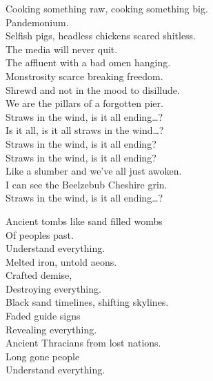 Cooking something raw, cooking something big. \\
Pandemonium. \\
Selfish pigs, headless chickens scared shitless. \\
The media will never quit. \\

The affluent with a bad omen hanging. \\
Monstrosity scarce breaking freedom. \\
Shrewd and not in the mood to disillude. \\
We are the pillars of a forgotten pier. \\

Straws in the wind, is it all ending…? \\

Is it all, is it all straws in the wind…? \\

Straws in the wind, is it all ending? \\
Straws in the wind, is it all ending? \\
Like a slumber and we've all just awoken. \\
I can see the Beelzebub Cheshire grin. \\

Straws in the wind, is it all ending…? \\






Ancient tombs like sand filled wombs \\
Of peoples  past. \\
Understand everything. \\
Melted iron, untold aeons. \\
Crafted demise, \\
Destroying everything. \\

Black sand timelines, shifting skylines. \\
Faded guide signs \\
Revealing everything. \\
Ancient Thracians from lost nations. \\
Long gone people \\
Understand everything. \\

